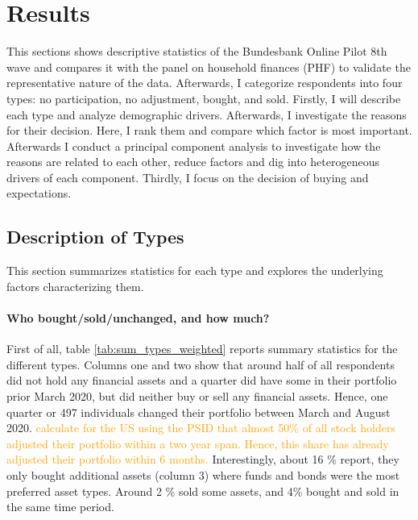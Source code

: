 \documentclass[ProjectABM]{subfiles}
\begin{document}
\section{Results}\label{sec:results}
This sections shows descriptive statistics of the Bundesbank Online Pilot 8th wave and compares it with the panel on household finances (PHF) to validate the representative nature of the data. Afterwards, I categorize respondents into four types: no participation, no adjustment, bought, and sold. Firstly, I will describe each type and analyze demographic drivers. Afterwards, I investigate the reasons for their decision. Here, I rank them and compare which factor is most important. Afterwards I conduct a principal component analysis to investigate how the reasons are related to each other, reduce factors and dig into heterogeneous drivers of each component. Thirdly, I focus on the decision of buying and expectations. 

\subsection{Description of Types}\label{sec:des_types}
This section summarizes statistics for each type and explores the underlying factors characterizing them.

\paragraph{Who bought/sold/unchanged, and how much?}
First of all, table \ref{tab:sum_types_weighted} reports summary statistics for the different types. Columns one and two show that around half of all respondents did not hold any financial assets and a quarter did have some in their portfolio prior March 2020, but did neither buy or sell any financial assets. Hence, one quarter or 497 individuals changed their portfolio between March and August 2020. \textcolor{orange}{\cite{bonaparte_et_al_2012adjustment} calculate for the US using the PSID that almost 50\% of all stock holders adjusted their portfolio within a two year span. Hence, this share has already adjusted their portfolio within 6 months.} %
Interestingly, about 16 \% report, they only bought additional assets (column 3) where funds and bonds were the most preferred asset types. Around 2 \% sold some assets, and 4\% bought and sold in the same time period.
\end{document}
